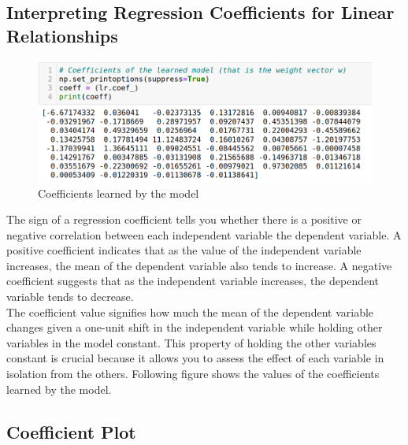 \documentclass[12pt]{article}
\begin{document}
\subsection{Interpreting Regression Coefficients for Linear Relationships}

\begin{figure}[h]
\centering
\includegraphics[scale=.4]{images/coefficients.png}
\caption{Coefficients learned by the model}
\end{figure}

The sign of a regression coefficient tells you whether there is a positive or negative correlation between each independent variable the dependent variable. A positive coefficient indicates that as the value of the independent variable increases, the mean of the dependent variable also tends to increase. A negative coefficient suggests that as the independent variable increases, the dependent variable tends to decrease.\\

The coefficient value signifies how much the mean of the dependent variable changes given a one-unit shift in the independent variable while holding other variables in the model constant. This property of holding the other variables constant is crucial because it allows you to assess the effect of each variable in isolation from the others. Following figure shows the values of the coefficients learned by the model.



\pagebreak
\subsection{Coefficient Plot}
\end{document}
